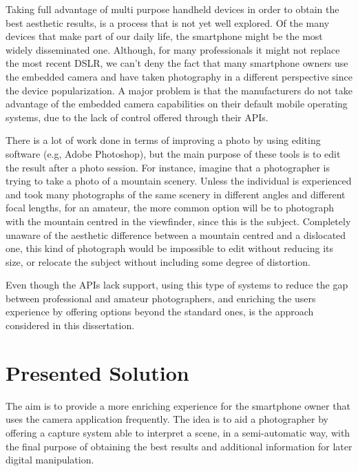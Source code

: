 Taking full advantage of multi purpose handheld devices in order to obtain the best aesthetic results, is a process that is not yet well explored. 
Of the many devices that make part of our daily life, the smartphone might be the most widely disseminated one. Although, for many professionals it might not replace the most recent DSLR, we can't deny the fact that many smartphone owners use the embedded camera and have taken photography in a different perspective since the device popularization. A major problem is that the manufacturers do not take advantage of the embedded camera capabilities on their default mobile operating systems, due to the lack of control offered through their APIs.

There is a lot of work done in terms of improving a photo by using editing software (e.g, Adobe Photoshop), but the main purpose of these tools is to edit the result after a photo session. For instance, imagine that a photographer is trying to take a photo of a mountain scenery. Unless the individual is experienced and took many photographs of the same scenery in different angles and different focal lengths, for an amateur, the more common option will be to photograph with the mountain centred in the viewfinder, since this is the subject. Completely unaware of the aesthetic difference between a mountain centred and a dislocated one, this kind of photograph would be impossible to edit without reducing its size, or relocate the subject without including some degree of distortion.

Even though the APIs lack  support, using this type of systems to reduce the gap between professional and amateur photographers, and enriching the users experience by offering options beyond the standard ones, is the approach considered in this dissertation.

\section{Presented Solution}

The aim is to provide a more enriching experience for the smartphone owner that uses the camera application frequently. The idea is to aid a photographer by offering a capture system able to interpret a scene, in a semi-automatic way, with the final purpose of obtaining the best results and additional information for later digital manipulation.

